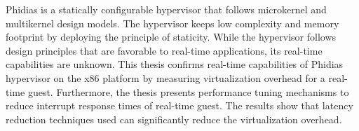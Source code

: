 Phidias is a statically configurable hypervisor that follows microkernel and multikernel design models.
The hypervisor keeps low complexity and memory footprint by deploying the principle of staticity.
While the hypervisor follows design principles that are favorable to real-time applications, its real-time capabilities are unknown.
This thesis confirms real-time capabilities of Phidias hypervisor on the x86 platform
by measuring virtualization overhead for a real-time guest. 
Furthermore, the thesis presents performance tuning
mechanisms to reduce interrupt response times of real-time guest. 
The results show that latency reduction techniques used can significantly reduce the virtualization overhead.
